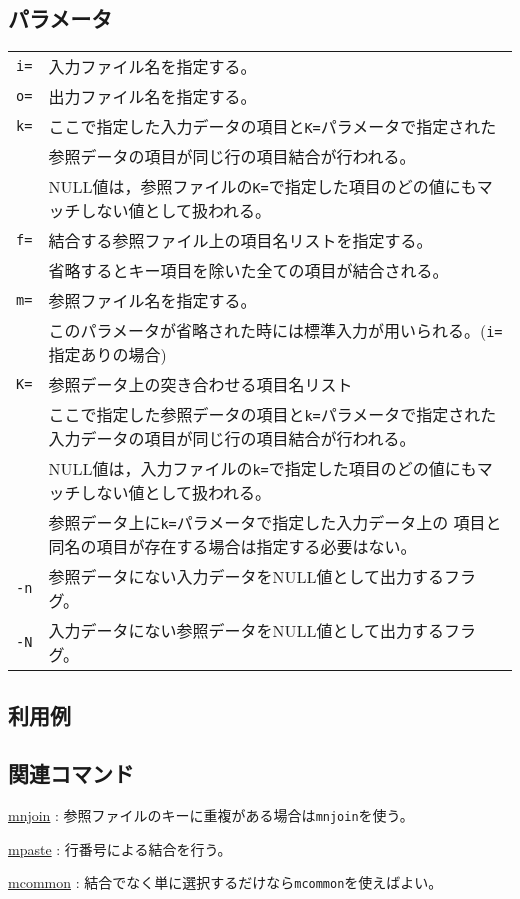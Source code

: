 \subsection*{パラメータ}
\begin{table}[htbp]
{\small
\begin{tabular}{ll}
\verb|i=|    & 入力ファイル名を指定する。\\
\verb|o=|    & 出力ファイル名を指定する。\\
\verb|k=|    & ここで指定した入力データの項目と\verb|K=|パラメータで指定された\\
             & 参照データの項目が同じ行の項目結合が行われる。\\
             & NULL値は，参照ファイルの\verb|K=|で指定した項目のどの値にもマッチしない値として扱われる。\\
\verb|f=|    & 結合する参照ファイル上の項目名リストを指定する。\\
             & 省略するとキー項目を除いた全ての項目が結合される。\\
\verb|m=|    & 参照ファイル名を指定する。\\
             & このパラメータが省略された時には標準入力が用いられる。(\verb|i=|指定ありの場合)\\
\verb|K=|    & 参照データ上の突き合わせる項目名リスト\\
             & ここで指定した参照データの項目と\verb|k=|パラメータで指定された入力データの項目が同じ行の項目結合が行われる。\\
             & NULL値は，入力ファイルの\verb|k=|で指定した項目のどの値にもマッチしない値として扱われる。\\
             & 参照データ上に\verb|k=|パラメータで指定した入力データ上の
               項目と同名の項目が存在する場合は指定する必要はない。\\
\verb|-n|    & 参照データにない入力データをNULL値として出力するフラグ。\\
\verb|-N|    & 入力データにない参照データをNULL値として出力するフラグ。\\
\end{tabular} 
}
\end{table} 

\subsection*{利用例}


\subsection*{関連コマンド}
\hyperref[sect:mnjoin]{mnjoin} : 参照ファイルのキーに重複がある場合は\verb|mnjoin|を使う。

\hyperref[sect:mpaste]{mpaste} : 行番号による結合を行う。

\hyperref[sect:mcommon]{mcommon} : 結合でなく単に選択するだけなら\verb|mcommon|を使えばよい。

%
